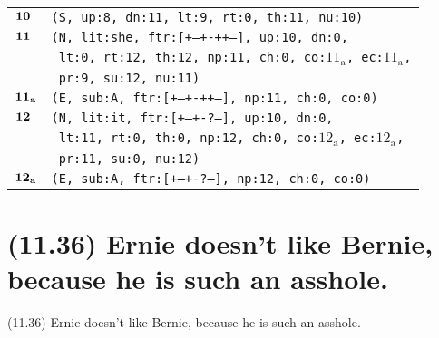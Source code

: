\documentclass{article}
\begin{document}
\begin{minipage}{\textwidth}
{\begin{tabular}{|r|l|}
    ${\textbf{\textrm{10}}_{\phantom{z}}}$ & \texttt{\texttt{(S,~up:8,~dn:11,~lt:9,~rt:0,~th:11,~nu:10)}} \\
    ${\textbf{\textrm{11}}_{\phantom{z}}}$ & \texttt{\texttt{(N,~lit:she,~ftr:[+--+-++--],~up:10,~dn:0,}} \\
    & \texttt{\texttt{~lt:0,~rt:12,~th:12,~np:11,~ch:0,~co:${\textrm{11}_{\textrm{a}}}$,~ec:${\textrm{11}_{\textrm{a}}}$,}} \\
    & \texttt{\texttt{~pr:9,~su:12,~nu:11)}} \\
    ${\textbf{\textrm{11}}_{\textbf{\textrm{a}}}}$ & \texttt{\texttt{(E,~sub:A,~ftr:[+--+-++--],~np:11,~ch:0,~co:0)}} \\
    ${\textbf{\textrm{12}}_{\phantom{z}}}$ & \texttt{\texttt{(N,~lit:it,~ftr:[+--+-?---],~up:10,~dn:0,}} \\
    & \texttt{\texttt{~lt:11,~rt:0,~th:0,~np:12,~ch:0,~co:${\textrm{12}_{\textrm{a}}}$,~ec:${\textrm{12}_{\textrm{a}}}$,}} \\
    & \texttt{\texttt{~pr:11,~su:0,~nu:12)}} \\
    ${\textbf{\textrm{12}}_{\textbf{\textrm{a}}}}$ & \texttt{\texttt{(E,~sub:A,~ftr:[+--+-?---],~np:12,~ch:0,~co:0)}} \\
    \hline
  \end{tabular}
  }
\end{minipage}
\bigbreak

\clearpage

%
%

\section*{(11.36) Ernie doesn't like Bernie, because he is such an asshole.}

\bigbreak
\begin{enumerate*}
\item[(11.36)] Ernie doesn't like Bernie, because he is such an asshole.
\end{enumerate*}
\bigbreak
\end{document}
